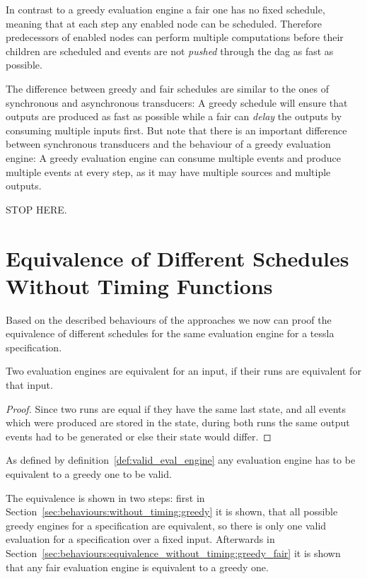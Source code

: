 In contrast to a greedy evaluation engine a fair one has no fixed schedule, meaning that at each step any enabled node can be scheduled.
Therefore predecessors of enabled nodes can perform multiple computations before their children are scheduled and events are not \emph{pushed} through the \gls{dag} as fast as possible.

The difference between greedy and fair schedules are similar to the ones of synchronous and asynchronous transducers: A greedy schedule will ensure that outputs are produced as fast as possible while a fair can \emph{delay} the outputs by consuming multiple inputs first.
But note that there is an important difference between synchronous transducers and the behaviour of a greedy evaluation engine: A greedy evaluation engine can consume multiple events and produce multiple events at every step, as it may have multiple sources and multiple outputs.


STOP HERE.

\section{Equivalence of Different Schedules Without Timing Functions}
\label{sec:behaviours:equivalence_without_timing}

Based on the described behaviours of the approaches we now can proof the equivalence of different schedules for the same evaluation engine for a \gls{tessla} specification.

\begin{lemma}[name = Equivalence of Engines for One Input]\label{lemma:eval_equivalent_if_runs_equal}
  Two evaluation engines are equivalent for an input, if their runs are equivalent for that input.
\end{lemma}

\begin{proof}
  Since two runs are equal if they have the same last state, and all events which were produced are stored in the state, during both runs the same output events had to be generated or else their state would differ.
\end{proof}

As defined by definition~\ref{def:valid_eval_engine} any evaluation engine has to be equivalent to a greedy one to be valid.

The equivalence is shown in two steps: first in Section~\ref{sec:behaviours:without_timing:greedy} it is shown, that all possible greedy engines for a specification are equivalent, so there is only one valid evaluation for a specification over a fixed input.
Afterwards in Section~\ref{sec:behaviours:equivalence_without_timing:greedy_fair} it is shown that any fair evaluation engine is equivalent to a greedy one.


